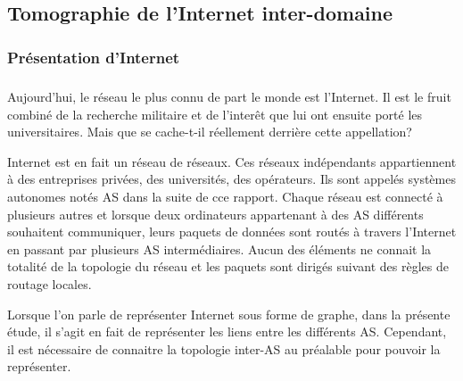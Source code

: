 
% 

\subsection{Tomographie de l'Internet inter-domaine}

\subsubsection{Pr\'esentation d'Internet}

\subparagraph{}
Aujourd'hui, le r\'eseau le plus connu de part le monde est l'Internet. Il est le fruit combin\'e de la recherche militaire et de l'inter\^et que lui ont ensuite port\'e les universitaires. Mais que se cache-t-il r\'eellement derri\`ere cette appellation?
\par
Internet est en fait un r\'eseau de r\'eseaux. Ces r\'eseaux ind\'ependants appartiennent \`a des entreprises priv\'ees, des universit\'es, des op\'erateurs. Ils sont appel\'es syst\`emes autonomes not\'es AS dans la suite de cce rapport. Chaque r\'eseau est connect\'e \`a plusieurs autres et lorsque deux ordinateurs appartenant \`a des AS diff\'erents souhaitent communiquer, leurs paquets de donn\'ees sont rout\'es \`a travers l'Internet en passant par plusieurs AS interm\'ediaires. Aucun des \'el\'ements ne connait la totalit\'e de la topologie du r\'eseau et les paquets sont dirig\'es suivant des r\`egles de routage locales.
\par
Lorsque l'on parle de repr\'esenter Internet sous forme de graphe, dans la pr\'esente \'etude, il s'agit en fait de repr\'esenter les liens entre les diff\'erents AS. Cependant, il est n\'ecessaire de connaitre la topologie inter-AS au pr\'ealable pour pouvoir la repr\'esenter.

